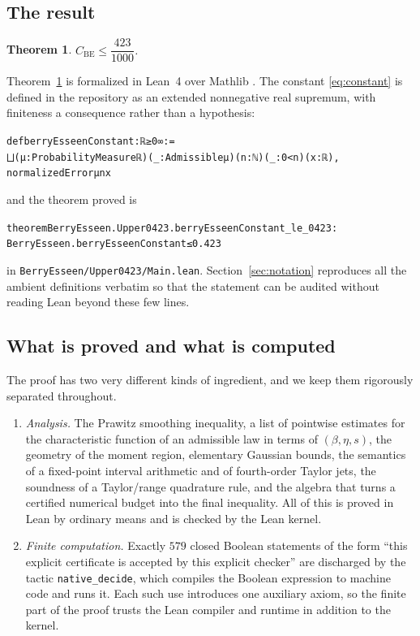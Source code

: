 \documentclass[11pt,a4paper]{article}
\newenvironment{leancode}{\par\smallskip\begin{alltt}\small}{\end{alltt}\smallskip}
\newtheorem{theorem}{Theorem}[section]
\theoremstyle{definition}
\newcommand{\Lean}[1]{\texttt{#1}}
\newcommand{\file}[1]{\texttt{#1}}
\begin{document}
\subsection{The result}

\begin{theorem}
  \label{thm:main}
  $C_{\mathrm{BE}}\le \dfrac{423}{1000}$.
\end{theorem}

Theorem~\ref{thm:main} is formalized in Lean~4 over Mathlib \cite{Mathlib}. The
constant \eqref{eq:constant} is defined in the repository as an extended
nonnegative real supremum, with finiteness a consequence rather than a hypothesis:

\begin{leancode}
def berryEsseenConstant : ℝ≥0∞ :=
  ⨆ (μ : ProbabilityMeasure ℝ) (_ : Admissible μ) (n : ℕ) (_ : 0 < n) (x : ℝ),
    normalizedError μ n x
\end{leancode}

\noindent and the theorem proved is
\begin{leancode}
theorem BerryEsseen.Upper0423.berryEsseenConstant_le_0423 :
    BerryEsseen.berryEsseenConstant ≤ 0.423
\end{leancode}
in \file{BerryEsseen/Upper0423/Main.lean}. Section~\ref{sec:notation} reproduces
all the ambient definitions verbatim so that the statement can be audited without
reading Lean beyond these few lines.

\subsection{What is proved and what is computed}

The proof has two very different kinds of ingredient, and we keep them
rigorously separated throughout.

\begin{enumerate}[label=(\alph*),leftmargin=2.2em]
\item \emph{Analysis.} The Prawitz smoothing inequality, a list of pointwise
  estimates for the characteristic function of an admissible law in terms of
  $(\beta,\eta,s)$, the geometry of the moment region, elementary Gaussian
  bounds, the semantics of a fixed-point interval arithmetic and of fourth-order
  Taylor jets, the soundness of a Taylor/range quadrature rule, and the algebra
  that turns a certified numerical budget into the final inequality. All of this
  is proved in Lean by ordinary means and is checked by the Lean kernel.

\item \emph{Finite computation.} Exactly $579$ closed Boolean statements of the
  form ``this explicit certificate is accepted by this explicit checker'' are
  discharged by the tactic \Lean{native\_decide}, which compiles the Boolean
  expression to machine code and runs it. Each such use introduces one auxiliary
  axiom, so the finite part of the proof trusts the Lean compiler and runtime in
  addition to the kernel.
\end{enumerate}
\end{document}
